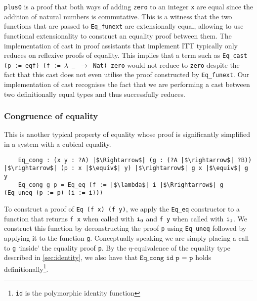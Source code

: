 \documentclass[12pt,twoside,maitrise]{dms}
\theoremstyle{definition}
\numberwithin{equation}{section}
\numberwithin{table}{chapter}
\numberwithin{figure}{chapter}
\newcommand\id[1] {\texttt{#1}}
\newcommand\fn[1] {\texttt{#1}}
\begin{document}
\id{plus0} is a proof that both ways of adding \id{zero} to an integer \id{x}
are equal since the addition of natural numbers is commutative. This is a
witness that the two functions that are passed to \id{Eq\_funext} are
extensionally equal, allowing to use functional extensionality to construct an
equality proof between them. The implementation of cast in proof assistants that
implement ITT typically only reduces on reflexive proofs of equality. This
implies that a term such as \fn{Eq\_cast (p := eqf) (f := $\lambda$ \_
  $\rightarrow$ Nat) zero} would not reduce to \id{zero} despite the fact that
this cast does not even utilise the proof constructed by \id{Eq\_funext}. Our
implementation of cast recognises the fact that we are performing a cast between
two definitionally equal types and thus successfully reduces.

\subsubsection*{Congruence of equality}\label{subsec:congruence-eq}
This is another typical property of equality whose proof is significantly
simplified in a system with a cubical equality.

\begin{verbatim}
    Eq_cong : (x y : ?A) |$\Rightarrow$| (g : (?A |$\rightarrow$| ?B)) |$\rightarrow$| (p : x |$\equiv$| y) |$\rightarrow$| g x |$\equiv$| g y
    Eq_cong g p = Eq_eq (f := |$\lambda$| i |$\Rrightarrow$| g (Eq_uneq (p := p) (i := i)))
\end{verbatim}

To construct a proof of \fn{Eq (f x) (f y)}, we apply the \id{Eq\_eq}
constructor to a function that returns \fn{f x} when called with $\ileft$ and
\fn{f y} when called with $\iright$. We construct this function by
deconstructing the proof \id{p} using \id{Eq\_uneq} followed by applying it to
the function \id{g}. Conceptually speaking we are simply placing a call to
\id{g} `inside' the equality proof \id{p}. By the $\eta$-equivalence of the
equality type described in \autoref{sec:identity}, we also have that
$\fn{Eq\_cong id p = p}$ holds definitionally\footnote{\id{id} is the
polymorphic identity function}.

\end{document}
